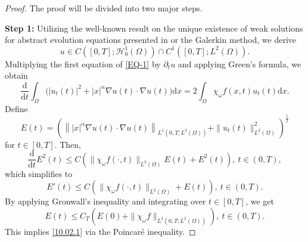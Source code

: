 \documentclass[11pt]{article}
\numberwithin{equation}{section}
\def\pt{\partial}
\def\bf{\textbf}
\def\pt{\partial}
\def\Om{\Omega}
\def\al{\alpha}
\def\f{\frac}
\def\df{\mathrm d}
\def\mcH{\mathcal{H}}
\begin{document}
		
		\begin{proof}   The proof will be divided into two major  steps.
			
			{\bf {\bf Step 1:}}  Utilizing the well-known result on the unique existence of weak solutions for abstract evolution equations presented in \cite{evans2010} or the Galerkin method, we derive
			\begin{equation*}
				u\in C([0,T]; \mcH_0^1(\Om))\cap C^1([0,T]; L^2(\Om)).
			\end{equation*}
			Multiplying the first equation of \eqref{EQ-1} by  $\pt_t u$  and applying Green's formula, we obtain
			\begin{equation*}
				\f{\df}{\df t}\int_\Om \Big(|u_t(t)|^2+|x|^\al \nabla u(t)\cdot \nabla u(t)\Big)\df x=2\int_\Om \chi_\omega f(x,t) u_t(t)\df x.
			\end{equation*}
			Define
			\begin{equation*}
				E(t)=\left(\left\||x|^\al \nabla u(t)\cdot \nabla u(t)\right\|_{L^1(0,T; L^2(\Om))}+\|u_t(t)\|_{L^2(\Om)}^2\right)^\f{1}{2}
			\end{equation*}
			for $t\in [0,T]$. Then,
			\begin{equation*}
				\f{\df}{\df t}E^2(t)\leq C\left(\|\chi_\omega f(\cdot, t)\|_{L^2(\Om)} E(t)+E^2(t)\right), \ t\in (0,T),
			\end{equation*}
			which simplifies to
			\begin{equation*}
				E'(t)\leq C\left(\|\chi_\omega f(\cdot, t)\|_{L^2(\Om)}+E(t)\right), \ t\in (0,T).
			\end{equation*}
			By applying Gronwall's inequality and integrating over $t\in [0,T]$, we get
			\begin{equation}\label{10.02.3}
				E(t)\leq C_T\left(E(0)+\|\chi_\omega f\|_{L^2(0,T; L^2(\Om))}\right),\ t\in (0,T).
			\end{equation}
			This implies \eqref{10.02.1} via the   Poincar\'e inequality.
			

\end{proof}
\end{document}
